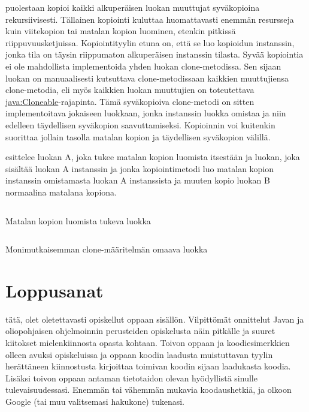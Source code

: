 \documentclass{tufte-book}
\newcommand{\java}[1]{\underline{\gls{java:#1}}}
\newcommand{\code}[3]{
\begin{listing}
    \inputminted{java}{OhjelmointiopasEsimerkit/src/#1/#2.java}
    \caption{#3}
    \label{Java-#1-#2}
\end{listing}
}
\begin{document}
 puolestaan kopioi kaikki alkuperäisen luokan muuttujat syväkopioina
rekursiivisesti. Tällainen kopiointi kuluttaa huomattavasti enemmän resursseja kuin viitekopion
tai matalan kopion luominen, etenkin pitkissä riippuvuusketjuissa. Kopiointityylin etuna on, että
se luo kopioidun instanssin, jonka tila on täysin riippumaton alkuperäisen instanssin tilasta.
Syvää kopiointia ei ole mahdollista implementoida yhden luokan clone-metodissa. Sen sijaan luokan
on manuaalisesti kutsuttava clone-metodissaan kaikkien muuttujiensa clone-metodia, eli myös
kaikkien luokan muuttujien on toteutettava \java{Cloneable}-rajapinta. Tämä syväkopioiva
clone-metodi on sitten implementoitava jokaiseen luokkaan, jonka instanssin luokka omistaa ja niin
edelleen täydellisen syväkopion saavuttamiseksi. Kopioinnin voi kuitenkin suorittaa jollain
tasolla matalan kopion ja täydellisen syväkopion välillä.

 esittelee luokan A, joka tukee matalan kopion luomista
itsestään ja luokan, joka sisältää luokan A instanssin ja jonka kopiointimetodi luo
matalan kopion instanssin omistamasta luokan A instanssista ja muuten kopio luokan B normaalina
matalana kopiona.

\code{week11/cloningexample}{DataPoint}{Matalan kopion luomista tukeva luokka}
\code{week11/cloningexample}{ComplexDataPoint}{Monimutkaisemman clone-määritelmän omaava luokka}


\chapter{Loppusanat}
\label{theEnd}

 tätä, olet oletettavasti opiskellut oppaan sisällön. Vilpittömät
onnittelut Javan ja oliopohjaisen ohjelmoinnin perusteiden opiskelusta näin pitkälle ja suuret
kiitokset mielenkiinnosta opasta kohtaan. Toivon oppaan ja koodiesimerkkien olleen avuksi
opiskeluissa ja oppaan koodin laadusta muistuttavan tyylin herättäneen kiinnostusta kirjoittaa
toimivan koodin sijaan laadukasta koodia. Lisäksi toivon oppaan antaman tietotaidon olevan
hyödyllistä sinulle tulevaisuudessasi. Enemmän tai vähemmän mukavia koodaushetkiä, ja olkoon
Google (tai muu valitsemasi hakukone) tukenasi.
\end{document}
